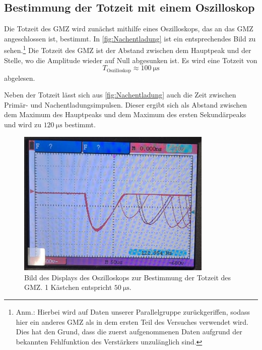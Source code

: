 \subsection{Bestimmung der Totzeit mit einem Oszilloskop}
Die Totzeit des GMZ wird zunächst mithilfe eines Oszilloskops, das an das GMZ angeschlossen ist, bestimmt. In \autoref{fig:Nachentladung} 
ist ein entsprechendes Bild zu sehen.\footnote{Anm.: Hierbei wird auf Daten unserer Parallelgruppe zurückgeriffen, sodass hier ein 
anderes GMZ als in dem ersten Teil des Versuches verwendet wird. Dies hat den Grund, dass die zuerst aufgenommenen Daten aufgrund der bekannten
Fehlfunktion des Verstärkers unzulänglich sind.} Die Totzeit des GMZ ist der Abstand zwischen dem Hauptpeak und der Stelle, wo die Amplitude wieder auf 
Null abgesunken ist. Es wird eine Totzeit von
\begin{equation*}
    T_{\text{Oszilloskop}} \approx \qty{100}{\micro\second}
\end{equation*}
abgelesen.

Neben der Totzeit lässt sich aus \autoref{fig:Nachentladung} auch die Zeit zwischen Primär- und Nachentladungsimpulsen. Dieser ergibt sich als Abstand
zwischen dem Maximum des Hauptpeaks und dem Maximum des ersten Sekundärpeaks und wird zu $\qty{120}{\micro\second}$ bestimmt.

\begin{figure}[H]
    \centering
    \includegraphics[height=7cm]{content/pics/Nachentladung.jpg}
    \caption{Bild des Displays des Oszilloskops zur Bestimmung der Totzeit des GMZ. 1 Kästchen entspricht $\qty{50}{\micro\second}$.}
    \label{fig:Nachentladung}
\end{figure}


